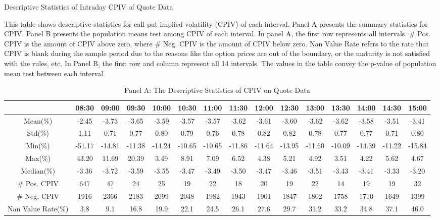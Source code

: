 \begin{table}[h]

\caption{Descriptive Statistics of Intraday CPIV of Quote Data}\label{table:stats_of_CPIV}
\begin{threeparttable}

\medskip


{\scriptsize 
This table shows descriptive statistics for call-put implied volatility (CPIV) of each interval. Panel A presents the summary statistics for CPIV. Panel B presents the population means test among CPIV of each interval. In panel A, the first row represents all intervals.  \# Pos. CPIV is the amount of CPIV above zero, where \# Neg. CPIV is the amount of CPIV below zero. Nan Value Rate refers to the rate that CPIV is blank during the sample period due to the reasons like the option prices are out of the boundary, or the maturity is not satisfied with the rules, etc. In Panel B, the first row and column represent all 14 intervals. The values in the table convey the p-value of population mean test between each interval. 
}
\medskip

\begin{subtable}[t]{\linewidth}

\caption{Panel A: The Descriptive Statistics of CPIV on Quote Data }
\tiny
\begin{tabular}{ccccccccccccccc}
\toprule
\textbf{}        & 08:30 & 09:00 & 09:30 & 10:00 & 10:30 & 11:00 & 11:30 & 12:00 & 12:30 & 13:00 & 13:30 & 14:00 & 14:30 & 15:00 \\ \midrule
Mean(\%)         & -2.45 & -3.73 & -3.65 & -3.59 & -3.57 & -3.57 & -3.62 & -3.61 & -3.60 & -3.62 & -3.62 & -3.58 & -3.51 & -3.41 \\
Std(\%)          & 1.11  & 0.71  & 0.77  & 0.80  & 0.79  & 0.76  & 0.78  & 0.82  & 0.82  & 0.78  & 0.77  & 0.77  & 0.71  & 0.80  \\
Min(\%)          & -51.17 & -14.81 & -11.38 & -14.24 & -10.65 & -10.65 & -11.86 & -11.64 & -13.95 & -11.60 & -10.09 & -14.39 & -11.22 & -15.84 \\
Max(\%)          & 43.20  & 11.69  & 20.39  & 3.49   & 8.91   & 7.09   & 6.52   & 4.38   & 5.21   & 4.92   & 3.51   & 4.22   & 5.62   & 4.67   \\
Median(\%)       & -3.36  & -3.72  & -3.59  & -3.55  & -3.47  & -3.49  & -3.50  & -3.47  & -3.46  & -3.51  & -3.43  & -3.41  & -3.33  & -3.20  \\
\# Pos. CPIV     & 647   & 47    & 24    & 25    & 19    & 22    & 18    & 20    & 19    & 22    & 14    & 19    & 19    & 32    \\
\# Neg. CPIV     & 1916  & 2366  & 2183  & 2099  & 2048  & 1982  & 1943  & 1901  & 1847  & 1802  & 1758  & 1710  & 1649  & 1399  \\
Nan Value Rate(\%) & 3.8   & 9.1   & 16.8  & 19.9  & 22.1  & 24.5  & 26.1  & 27.6  & 29.7  & 31.2  & 33.2  & 34.8  & 37.1  & 46.0  \\ \bottomrule
\end{tabular}
\end{subtable}


\end{threeparttable}
\end{table}
